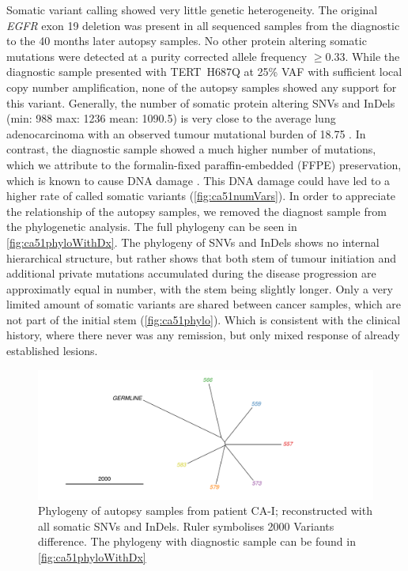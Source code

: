 Somatic variant calling showed very little genetic heterogeneity. The original \textit{EGFR} exon 19 deletion was present in all sequenced samples from the diagnostic to the 40 months later autopsy samples. No other protein altering somatic mutations were detected at a purity corrected allele frequency $\geq 0.33$. While the diagnostic sample presented with TERT~H687Q at 25\% VAF with sufficient local copy number amplification, none of the autopsy samples showed any support for this variant. Generally, the number of somatic protein altering SNVs and InDels (min: 988 max: 1236 mean: 1090.5)  is very close to the average lung adenocarcinoma with an observed tumour mutational burden of 18.75 \cite{Alexandrov2013}. 
In contrast, the diagnostic sample showed a much higher number of mutations, which we attribute to the formalin-fixed paraffin-embedded (FFPE) preservation, which is known to cause DNA damage \cite{Do2015}. This DNA damage could have led to a higher rate of called somatic variants (\autoref{fig:ca51numVars}). In order to appreciate the relationship of the autopsy samples, we removed the diagnost sample from the phylogenetic analysis. The full phylogeny can be seen in \autoref{fig:ca51phyloWithDx}. The phylogeny of SNVs and InDels shows no internal hierarchical structure, but rather shows that both stem of tumour initiation and additional private mutations accumulated during the disease progression are approximatly equal in number, with the stem being slightly longer. Only a very limited amount of somatic variants are shared between cancer samples, which are not part of the initial stem (\autoref{fig:ca51phylo}). Which is consistent with the clinical history, where there never was any remission, but only mixed response of already established lesions.

\begin{figure}[ht]
	\centering
	\includegraphics[width=.99\linewidth]{Figures/CASCADE/CA51/CA51phyloAutopsy.pdf}
	\caption[Phylogeny of autopsy samples from patient CA-I]{Phylogeny of autopsy samples from patient CA-I; reconstructed with all somatic SNVs and InDels. Ruler symbolises 2000 Variants difference. The phylogeny with diagnostic sample can be found in \protect\autoref{fig:ca51phyloWithDx}} \label{fig:ca51phylo}
\end{figure}

